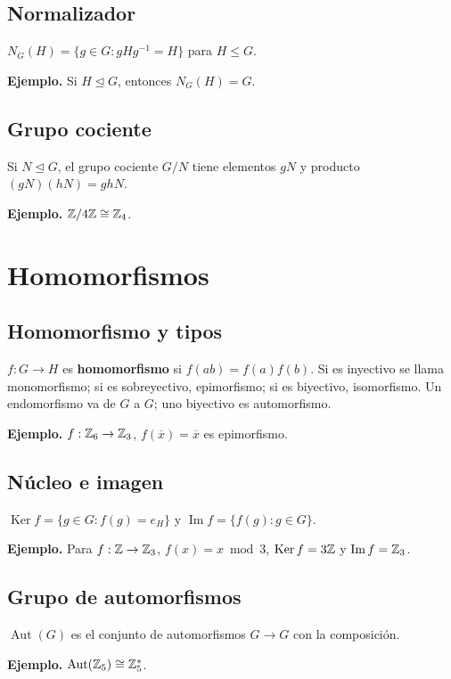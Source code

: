 \documentclass[11pt,a4paper]{article}
\newcommand{\Ker}{\operatorname{Ker}}\newcommand{\Imf}{\operatorname{Im}}\newcommand{\Aut}{\operatorname{Aut}}\newcommand{\mcd}{\operatorname{mcd}}\newcommand{\mcm}{\operatorname{mcm}}
\begin{document}
\subsection{Normalizador}
\begin{definicion}
$N_G(H)=\{g\in G:gHg^{-1}=H\}$ para $H\le G$.
\end{definicion}
\textbf{Ejemplo.} Si $H\trianglelefteq G$, entonces $N_G(H)=G$.


\subsection{Grupo cociente}
\begin{definicion}
Si $N\trianglelefteq G$, el grupo cociente $G/N$ tiene elementos $gN$ y producto $(gN)(hN)=ghN$.
\end{definicion}
\textbf{Ejemplo.} $\mathbb{Z}/4\mathbb{Z}\cong\mathbb{Z}_4$.


\section{Homomorfismos}

\subsection{Homomorfismo y tipos}
\begin{definicion}
$f:G\to H$ es \textbf{homomorfismo} si $f(ab)=f(a)f(b)$. Si es inyectivo se llama monomorfismo; si es sobreyectivo, epimorfismo; si es biyectivo, isomorfismo. Un endomorfismo va de $G$ a $G$; uno biyectivo es automorfismo.
\end{definicion}
\textbf{Ejemplo.} $f:\mathbb{Z}_6\to\mathbb{Z}_3$, $f(\overline x)=\overline x$ es epimorfismo.


\subsection{Núcleo e imagen}
\begin{definicion}
$\Ker f=\{g\in G:f(g)=e_H\}$ y $\Imf f=\{f(g):g\in G\}$.
\end{definicion}
\textbf{Ejemplo.} Para $f:\mathbb{Z}\to\mathbb{Z}_3$, $f(x)=x\bmod 3$, $\Ker f=3\Z$ y $\Imf f=\Z_3$.


\subsection{Grupo de automorfismos}
\begin{definicion}
$\Aut(G)$ es el conjunto de automorfismos $G\to G$ con la composición.
\end{definicion}
\textbf{Ejemplo.} $\Aut(\Z_5)\cong\Z_5^*$.
\end{document}
